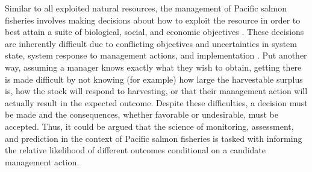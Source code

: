 \documentclass[12pt,]{book}
\theoremstyle{definition}
\theoremstyle{definition}
\theoremstyle{definition}
\theoremstyle{remark}
\begin{document}
Similar to all exploited natural resources, the management of Pacific
salmon fisheries involves making decisions about how to exploit the
resource in order to best attain a suite of biological, social, and
economic objectives \citep{walters-1986}. These decisions are inherently
difficult due to conflicting objectives and uncertainties in system
state, system response to management actions, and implementation
\citep{walters-holling-1990}. Put another way, assuming a manager knows
exactly what they wish to obtain, getting there is made difficult by not
knowing (for example) how large the harvestable surplus is, how the
stock will respond to harvesting, or that their management action will
actually result in the expected outcome. Despite these difficulties, a
decision must be made \citep[without decision-making there is no
management;][]{hilborn-walters-1992} and the consequences, whether
favorable or undesirable, must be accepted. Thus, it could be argued
that the science of monitoring, assessment, and prediction in the
context of Pacific salmon fisheries is tasked with informing the
relative likelihood of different outcomes conditional on a candidate
management action.
\end{document}
